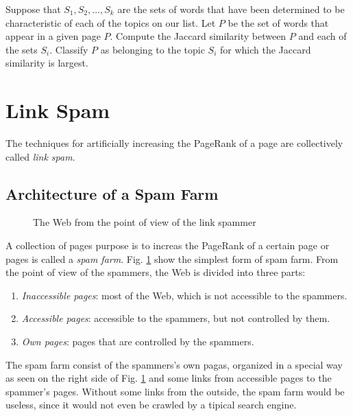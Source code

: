 Suppose that $S_1, S_2, \ldots, S_k$ are the sets of words that have been determined to be characteristic of each of the topics on our list. Let $P$ be the set of words that appear in a given page $P$. Compute the Jaccard similarity between $P$ and each of the sets $S_i$. Classify $P$ as belonging to the topic $S_i$ for which the Jaccard similarity is largest.

\section{Link Spam}\label{sec:link-spam}

The techniques for artificially increasing the PageRank of a page are collectively called \textit{link spam}.

\subsection{Architecture of a Spam Farm}\label{subsec:architecture-spam-farm}

\begin{figure}[H]
\centering
\scalebox{0.6}{
    
}
\caption{The Web from the point of view of the link spammer}
\label{fig:web-for-spammers}
\end{figure}



A collection of pages purpose is to increas the PageRank of a certain page or pages is called a \textit{spam farm}. Fig. \ref{fig:web-for-spammers} show the simplest form of spam farm. From the point of view of the spammers, the Web is divided into three parts:

\begin{enumerate}
    \item \textit{Inaccessible pages}: most of the Web, which is not accessible to the spammers.
    \item \textit{Accessible pages}: accessible to the spammers, but not controlled by them.
    \item \textit{Own pages}: pages that are controlled by the spammers.
\end{enumerate}

The spam farm consist of the spammers's own pagas, organized in a special way as seen on the right side of Fig. \ref{fig:web-for-spammers} and some links from accessible pages to the spammer's pages. Without some links from the outside, the spam farm would be useless, since it would not even be crawled by a tipical search engine.

